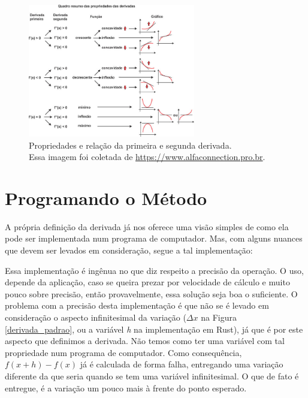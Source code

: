 \begin{figure}[h]
    \centering
    \includegraphics[width=0.65\textwidth]{src/relacao_primeira_segunda_derivada.jpg}
    \captionsetup{justification=centering}
    \caption{
        Propriedades e relação da primeira e segunda derivada.\\
        \tiny Essa imagem foi coletada de \url{https://www.alfaconnection.pro.br}.
    }
    \label{relacao_primeira_segunda_derivada}
\end{figure}


\section{{Programando o Método}}

\hspace{0.8cm}


A própria definição da derivada já nos oferece uma visão simples de como
ela pode ser implementada num programa de computador. Mas, com alguns nuances
que devem ser levados em consideração, segue a tal implementação:




Essa implementação é ingênua no que diz respeito a precisão da operação. O
uso, depende da aplicação, caso se queira prezar por velocidade de cálculo e
muito pouco sobre precisão, então provavelmente, essa solução seja boa o
suficiente. O problema com a precisão desta implementação é que não se é
levado em consideração o aspecto infinitesimal da variação (\(\Delta x\) na
Figura \ref{derivada_padrao}, ou a variável \textit{h} na implementação
em Rust), já que é por este aspecto que definimos a derivada. Não temos como ter
uma variável com tal propriedade num programa de computador. Como consequência,
\(f(x + h) - f(x)\) já é calculada de forma falha, entregando uma variação
diferente da que seria quando se tem uma variável infinitesimal. O que de fato
é entregue, é a variação um pouco mais à frente do ponto esperado.

